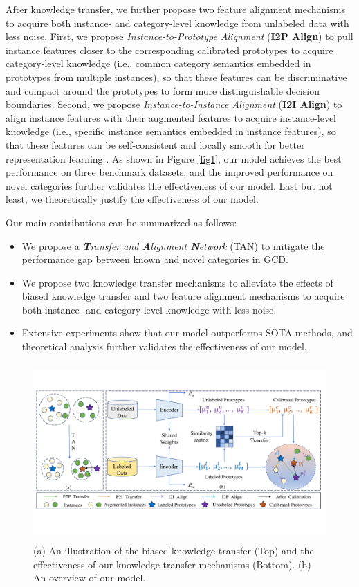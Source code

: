 \documentclass[letterpaper]{article} %
\begin{document}
After knowledge transfer, we further propose two feature alignment mechanisms to acquire both instance- and category-level knowledge from unlabeled data with less noise.
First, we propose \textit{Instance-to-Prototype Alignment} (\textbf{I2P Align}) to pull instance features closer to the corresponding calibrated prototypes to acquire category-level knowledge (i.e., common category semantics embedded in prototypes from multiple instances), so that these features can be discriminative and compact around the prototypes to form more distinguishable decision boundaries.
Second, we propose \textit{Instance-to-Instance Alignment} (\textbf{I2I Align}) to align instance features with their augmented features to acquire instance-level knowledge (i.e., specific instance semantics embedded in instance features), so that these features can be self-consistent and locally smooth for better representation learning \citep{simclr}.
As shown in Figure \ref{fig1}, our model achieves the best performance on three benchmark datasets, and the improved performance on novel categories further validates the effectiveness of our model.
Last but not least, we theoretically justify the effectiveness of our model.

Our main contributions can be summarized as follows:
\begin{itemize}
  \item We propose a \textit{\textbf{T}ransfer and \textbf{A}lignment \textbf{N}etwork} (TAN) to mitigate the performance gap between known and novel categories in GCD.
  \item We propose two knowledge transfer mechanisms to alleviate the effects of biased knowledge transfer and two feature alignment mechanisms to acquire both instance- and category-level knowledge with less noise.
  \item Extensive experiments show that our model outperforms SOTA methods, and theoretical analysis further validates the effectiveness of our model.
\end{itemize}


\begin{figure}
\centering
\includegraphics[width=16cm, height=6.8cm]{model_v2.pdf}
\caption{(a) An illustration of the biased knowledge transfer (Top) and the effectiveness of our knowledge transfer mechanisms (Bottom). (b) An overview of our model.}
\label{fig2}
\end{figure}
\end{document}
